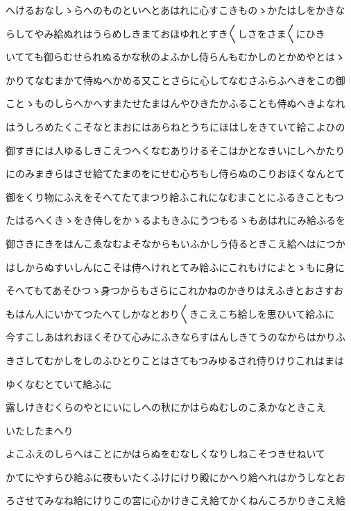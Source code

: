 \documentclass[a4paper,11pt,landscape]{ltjtarticle}
\begin{document}
\par\medskip
へけるおなしゝらへのものといへとあはれに心すこきものゝかたはしをかきな
\par\medskip
らしてやみ給ぬれはうらめしきまておほゆれとすき〱しさをさま〱にひき
\par\medskip
いてても御らむせられぬるかな秋のよふかし侍らんもむかしのとかめやとはゝ
\par\medskip
かりてなむまかて侍ぬへかめる又ことさらに心してなむさふらふへきをこの御
\par\medskip
ことゝものしらへかへすまたせたまはんやひきたかふることも侍ぬへきよなれ
\par\medskip
はうしろめたくこそなとまおにはあらねとうちにほはしをきていて給こよひの
\par\medskip
御すきには人ゆるしきこえつへくなむありけるそこはかとなきいにしへかたり
\par\medskip
にのみまきらはさせ給てたまのをにせむ心ちもし侍らぬのこりおほくなんとて
\par\medskip
御をくり物にふえをそへてたてまつり給ふこれになむまことにふるきこともつ
\par\medskip
たはるへくきゝをき侍しをかゝるよもきふにうつもるゝもあはれにみ給ふるを
\par\medskip
御さきにきをはんこゑなむよそなからもいふかしう侍るときこえ給へはにつか
\par\medskip
はしからぬすいしんにこそは侍へけれとてみ給ふにこれもけによとゝもに身に
\par\medskip
そへてもてあそひつゝ身つからもさらにこれかねのかきりはえふきとおさすお
\par\medskip
もはん人にいかてつたへてしかなとおり〱きこえこち給しを思ひいて給ふに
\par\medskip
今すこしあはれおほくそひて心みにふきならすはんしきてうのなからはかりふ
\par\medskip
きさしてむかしをしのふひとりことはさてもつみゆるされ侍りけりこれはまは
\par\medskip
ゆくなむとていて給ふに
\par\medskip
露しけきむくらのやとにいにしへの秋にかはらぬむしのこゑかなときこえ
\par\medskip
いたしたまへり
\par\medskip
よこふえのしらへはことにかはらぬをむなしくなりしねこそつきせねいて
\par\medskip
かてにやすらひ給ふに夜もいたくふけにけり殿にかへり給へれはかうしなとお
\par\medskip
ろさせてみなね給にけりこの宮に心かけきこえ給てかくねんころかりきこえ給
\end{document}
